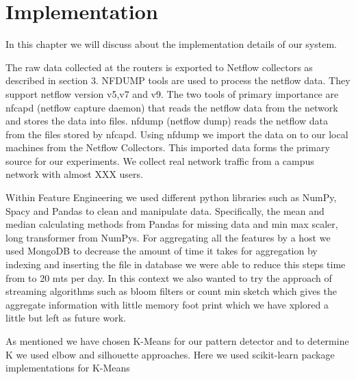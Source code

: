 
\chapter{Implementation}

In this chapter we will discuss about the implementation details of our system. 

The raw data collected at the routers is exported to Netflow
collectors as described in section 3. NFDUMP \cite{} tools are
used to process the netflow data. They support netflow version v5,v7
and v9. The two tools of primary importance are nfcapd
(netflow capture daemon) that reads the netflow data from
the network and stores the data into files. nfdump (netflow
dump) reads the netflow data from the files stored by nfcapd.
Using nfdump we import the data on to our local machines
from the Netflow Collectors. This imported data forms the
primary source for our experiments. We collect real network
traffic from a campus network with almost XXX users.

Within Feature Engineering we used different python libraries such as NumPy, Spacy and Pandas to clean and manipulate data. Specifically, the mean and median calculating methods from Pandas for missing data and min max scaler, long transformer from NumPys.
For aggregating all the features by a host we used MongoDB to decrease the amount of time it takes for aggregation by indexing \cite{} and inserting the file in database we were able to reduce this steps time from to 20 mts per day. In this context we also wanted to try the approach of streaming algorithms such as bloom filters or count min sketch which gives the aggregate information with little memory foot print which we have xplored a little but left as future work.

As mentioned we have chosen K-Means for our pattern detector and to determine K we used elbow and silhouette approaches. Here we used scikit-learn package implementations for K-Means 
